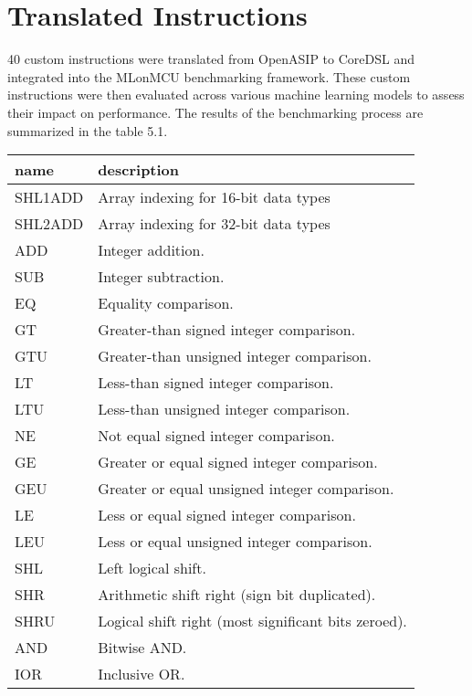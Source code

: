 \section{Translated Instructions}

40 custom instructions were translated from OpenASIP to CoreDSL and integrated into the MLonMCU benchmarking framework. These custom instructions were then evaluated across various machine learning models to assess their impact on performance. The results of the benchmarking process are summarized in the table 5.1.

\begin{table}[htbp]
    \centering
    \begin{tabularx}{\textwidth}{|l|X|}
    \hline
    \textbf{name} & \textbf{description} \\ \hline
    SHL1ADD & Array indexing for 16-bit data types \\ \hline
    SHL2ADD & Array indexing for 32-bit data types \\ \hline
    ADD & Integer addition.  \\ \hline
    SUB & Integer subtraction.  \\ \hline
    EQ & Equality comparison.  \\ \hline
    GT & Greater-than signed integer comparison.  \\ \hline
    GTU & Greater-than unsigned integer comparison.  \\ \hline
    LT & Less-than signed integer comparison. \\ \hline
    LTU & Less-than unsigned integer comparison. \\ \hline
    NE & Not equal signed integer comparison. \\ \hline
    GE & Greater or equal signed integer comparison. \\ \hline
    GEU & Greater or equal unsigned integer comparison. \\ \hline
    LE & Less or equal signed integer comparison. \\ \hline
    LEU & Less or equal unsigned integer comparison. \\ \hline
    SHL & Left logical shift. \\ \hline
    SHR & Arithmetic shift right (sign bit duplicated). \\ \hline
    SHRU & Logical shift right (most significant bits zeroed). \\ \hline
    AND & Bitwise AND.  \\ \hline
    IOR & Inclusive OR.  \\ \hline

\end{tabularx}
\end{table}
